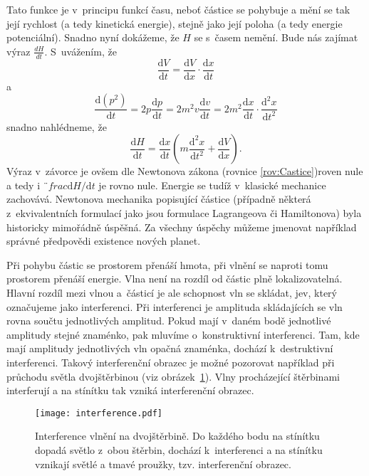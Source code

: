 Tato funkce je v~principu funkcí času, neboť částice se pohybuje a mění se tak její rychlost (a tedy kinetická energie), stejně jako její poloha (a tedy energie potenciální). Snadno nyní dokážeme, že $H$ se s~časem nemění. Bude nás zajímat výraz $\frac {dH}{dt}$. S~uvážením, že
\begin{equation}
\frac{\mathrm{d}V}{\mathrm{d}t} = \frac{\mathrm{d}V}{\mathrm{d}x}\cdot \frac{\mathrm{d}x}{\mathrm{d}t}\mbox{}
\label{rov:Castice2}
\end{equation}
a
\begin{equation}
\frac{\mathrm{d} (p^2)}{\mathrm{d}t}=2p\frac{\mathrm{d}p}{\mathrm{d}t}=2m^2v\frac{\mathrm{d}v}{\mathrm{d}t}=2m^2\frac{\mathrm{d}x}{\mathrm{d}t}\cdot\frac{\mathrm{d}^2x}{\mathrm{d}t^2}\mbox{}
\label{rov:Castice3}
\end{equation}
snadno nahlédneme, že
\begin{equation}
\frac{\mathrm{d}H}{\mathrm{d}t}=\frac{\mathrm{d}x}{\mathrm{d}t}\left ( m\frac{\mathrm{d}^2x}{\mathrm{d}t^2}+\frac{\mathrm{d}V}{\mathrm{d}x}\right )\mbox{.}
\label{rov:Castice4}
\end{equation}
Výraz v~závorce je ovšem dle Newtonova zákona (rovnice \ref{rov:Castice})roven nule a tedy i $¨frac{\mathrm{d}H}/{\mathrm{d}t}$ je rovno nule. Energie se tudíž v~klasické mechanice zachovává.
Newtonova mechanika popisující částice (případně některá z~ekvivalentních formulací jako jsou formulace Lagrangeova či Hamiltonova) byla historicky mimořádně úspěšná. Za všechny úspěchy můžeme jmenovat například správné předpovědi existence nových planet. 

Při pohybu částic se prostorem přenáší hmota, při vlnění se naproti tomu prostorem přenáší energie. Vlna není na rozdíl od částic plně lokalizovatelná. Hlavní rozdíl mezi vlnou a~částicí je ale schopnost vln se skládat, jev, který označujeme jako interferenci. Při interferenci je amplituda skládajících se vln rovna součtu jednotlivých amplitud. Pokud mají v~daném bodě jednotlivé amplitudy stejné znaménko, pak mluvíme o~konstruktivní interferenci. Tam, kde mají amplitudy jednotlivých vln opačná znaménka, dochází k~destruktivní interferenci. Takový interferenční obrazec je možné pozorovat například při průchodu světla  dvojštěrbinou (viz obrázek~\ref{obr:Interference}). Vlny procházející štěrbinami interferují a na stínítku tak vzniká interferenční obrazec. 

\begin{figure} [ht]
\centering
\texttt{[image: interference.pdf]}
\caption[Interference vlnění]{Interference vlnění na dvojštěrbině. Do každého bodu na stínítku dopadá světlo z~obou štěrbin, dochází k~interferenci a na stínítku vznikají světlé a tmavé proužky, tzv. interferenční obrazec.}
\label{obr:Interference}
\end{figure}

